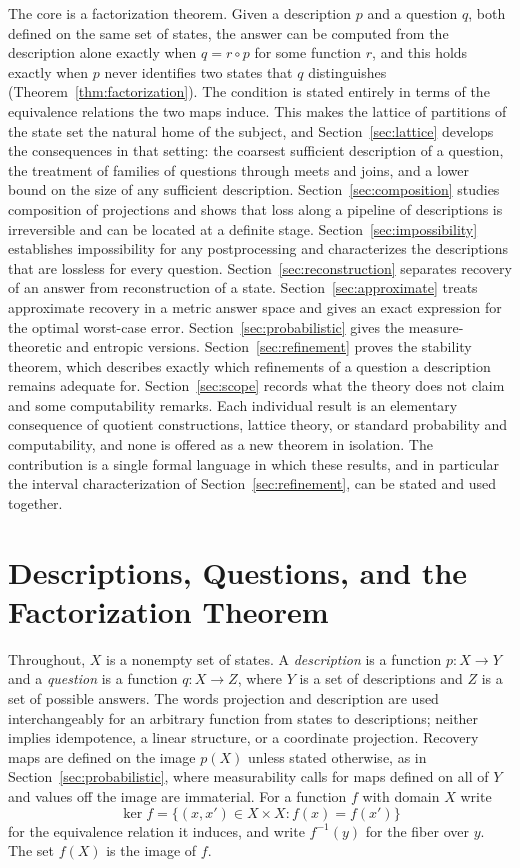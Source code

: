 \documentclass[11pt]{article}
\theoremstyle{definition}
\theoremstyle{remark}
\begin{document}
The core is a factorization theorem. Given a description $p$ and a question $q$, both defined on the same set of states, the answer can be computed from the description alone exactly when $q=r\circ p$ for some function $r$, and this holds exactly when $p$ never identifies two states that $q$ distinguishes (Theorem~\ref{thm:factorization}). The condition is stated entirely in terms of the equivalence relations the two maps induce. This makes the lattice of partitions of the state set the natural home of the subject, and Section~\ref{sec:lattice} develops the consequences in that setting: the coarsest sufficient description of a question, the treatment of families of questions through meets and joins, and a lower bound on the size of any sufficient description. Section~\ref{sec:composition} studies composition of projections and shows that loss along a pipeline of descriptions is irreversible and can be located at a definite stage. Section~\ref{sec:impossibility} establishes impossibility for any postprocessing and characterizes the descriptions that are lossless for every question. Section~\ref{sec:reconstruction} separates recovery of an answer from reconstruction of a state. Section~\ref{sec:approximate} treats approximate recovery in a metric answer space and gives an exact expression for the optimal worst-case error. Section~\ref{sec:probabilistic} gives the measure-theoretic and entropic versions. Section~\ref{sec:refinement} proves the stability theorem, which describes exactly which refinements of a question a description remains adequate for. Section~\ref{sec:scope} records what the theory does not claim and some computability remarks. Each individual result is an elementary consequence of quotient constructions, lattice theory, or standard probability and computability, and none is offered as a new theorem in isolation. The contribution is a single formal language in which these results, and in particular the interval characterization of Section~\ref{sec:refinement}, can be stated and used together.

\section{Descriptions, Questions, and the Factorization Theorem}

Throughout, $X$ is a nonempty set of states. A \emph{description} is a function $p:X\to Y$ and a \emph{question} is a function $q:X\to Z$, where $Y$ is a set of descriptions and $Z$ is a set of possible answers. The words projection and description are used interchangeably for an arbitrary function from states to descriptions; neither implies idempotence, a linear structure, or a coordinate projection. Recovery maps are defined on the image $p(X)$ unless stated otherwise, as in Section~\ref{sec:probabilistic}, where measurability calls for maps defined on all of $Y$ and values off the image are immaterial. For a function $f$ with domain $X$ write
\[
\ker f=\{(x,x')\in X\times X : f(x)=f(x')\}
\]
for the equivalence relation it induces, and write $f^{-1}(y)$ for the fiber over $y$. The set $f(X)$ is the image of $f$.
\end{document}
